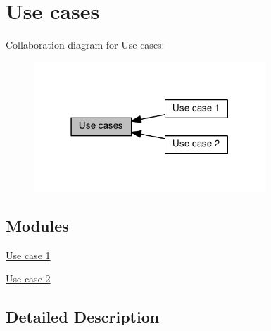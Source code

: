 \hypertarget{group__usecase}{}\section{Use cases}
\label{group__usecase}
Collaboration diagram for Use cases\+:\nopagebreak
\begin{figure}[H]
\begin{center}
\leavevmode
\includegraphics[width=247pt]{group__usecase}
\end{center}
\end{figure}
\subsection*{Modules}
\begin{DoxyCompactItemize}
\item 
\hyperlink{group__usecase1}{Use case 1}
\item 
\hyperlink{group__usecase2}{Use case 2}
\end{DoxyCompactItemize}


\subsection{Detailed Description}



